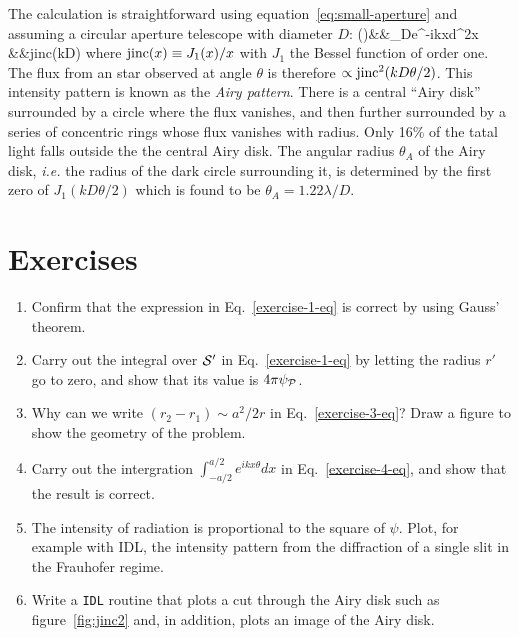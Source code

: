 The calculation is straightforward using equation~\ref{eq:small-aperture} and assuming a circular
aperture telescope with diameter $D$:
\bua
\psi(\theta)&\propto&\int_{\pi D}e^{-ik{\bm x}\cdot{\bm\theta}}d^2x \\
            &\propto&{\rm jinc}\left({kD\theta{}}\right)
\eua
where ${\rm jinc}(x)\equiv {J_1(x)/x}$ with $J_1$ the Bessel function of order one. The
flux from an star observed at angle $\theta$ is therefore $\propto{\rm jinc}^2({kD\theta/2})$.
This intensity pattern is known as the {\it Airy pattern}. There is a central ``Airy disk'' 
surrounded by a circle where the flux vanishes, and then further surrounded by a series of 
concentric rings whose flux vanishes with radius. Only 16\% of the tatal light falls outside
the the central Airy disk. The angular radius $\theta_A$ of the Airy disk, {\it i.e.} the 
radius of the dark circle surrounding it, is determined by the first zero of 
$J_1({kD\theta/2})$ which is found to be $\theta_A={1.22\lambda/D}$. 

\section{Exercises}

\begin{enumerate}
	\item Confirm that the expression in Eq.~\ref{exercise-1-eq} is correct by using Gauss'
		theorem.
	\item Carry out the integral over ${\cal S}'$ in Eq.~\ref{exercise-1-eq} by letting the
		radius $r'$ go to zero, and show that
		its value is $4\pi\psi_{{\cal P}}$.
	\item Why can we write $(r_2-r_1)\sim a^2/2r$ in Eq.~\ref{exercise-3-eq}?
	Draw a figure to show
  the geometry of the problem.
	\item Carry out the intergration $\int_{-{a/2}}^{a/2}e^{ikx\theta}dx$ in
	Eq.~\ref{exercise-4-eq}, and show that the result is correct. 
	\item The intensity of radiation is proportional to the square of
  $\psi$. Plot, for example with {\sc IDL}, the intensity pattern from
  the diffraction of a single slit in the Frauhofer regime.
	\item Write a {\tt IDL} routine that plots a cut through the Airy disk such as figure~\ref{fig:jinc2}
and, in addition, plots an image of the Airy disk.
\end{enumerate}


%
